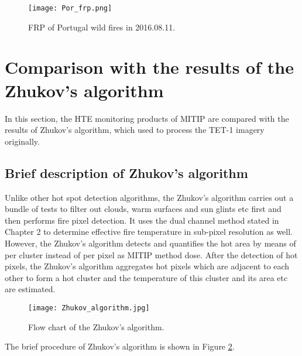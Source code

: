 \begin{figure}[!htbp]
\centering
\texttt{[image: Por\_frp.png]}
\caption{FRP of Portugal wild fires in 2016.08.11.}
\label{fig:Por_frp}
\end{figure}


\section{Comparison with the results of the Zhukov's algorithm}
In this section, the HTE monitoring products of MITIP are compared with the results of Zhukov's algorithm, which used to process the TET-1 imagery originally.\\


\subsection{Brief description of Zhukov's algorithm}
Unlike other hot spot detection algorithms, the Zhukov's algorithm carries out a bundle of tests to filter out clouds, warm surfaces and sun glints etc first and then performs fire pixel detection. It uses the dual channel method stated in Chapter 2 to determine effective fire temperature in sub-pixel resolution as well. However, the Zhukov's algorithm detects and quantifies the hot area by means of per cluster instead of per pixel as MITIP method dose. After the detection of hot pixels, the Zhukov's algorithm aggregates hot pixels which are adjacent to each other to form a hot cluster and the temperature of this cluster and its area etc are estimated.\\

\begin{figure}[!htbp]
\centering
\texttt{[image: Zhukov\_algorithm.jpg]}
\caption{Flow chart of the Zhukov's algorithm.}
\label{fig:Zhu_alg}
\end{figure}

\noindent The brief procedure of Zhukov's algorithm is shown in Figure \ref{fig:Zhu_alg}.\\


